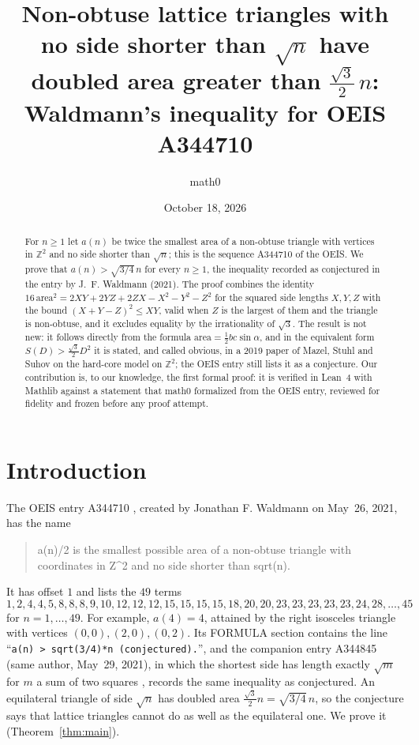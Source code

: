 \documentclass[11pt]{amsart}
\title[Non-obtuse lattice triangles (OEIS A344710)]{Non-obtuse lattice triangles with no side shorter than $\sqrt{n}$ have doubled area greater than $\frac{\sqrt3}{2}\,n$: Waldmann's inequality for OEIS A344710}
\author{math0}
\date{October 18, 2026}
\theoremstyle{plain}
\theoremstyle{definition}
\newcommand{\Z}{\mathbb{Z}}
\begin{document}
\begin{abstract}
For $n\ge1$ let $a(n)$ be twice the smallest area of a non-obtuse triangle with vertices in $\Z^2$ and no side shorter than $\sqrt n$; this is the sequence A344710 of the OEIS.
We prove that $a(n)>\sqrt{3/4}\,n$ for every $n\ge1$, the inequality recorded as conjectured in the entry by J.~F. Waldmann (2021).
The proof combines the identity $16\,\mathrm{area}^2=2XY+2YZ+2ZX-X^2-Y^2-Z^2$ for the squared side lengths $X,Y,Z$ with the bound $(X+Y-Z)^2\le XY$, valid when $Z$ is the largest of them and the triangle is non-obtuse, and it excludes equality by the irrationality of $\sqrt3$.
The result is not new: it follows directly from the formula $\mathrm{area}=\frac12 bc\sin\alpha$, and in the equivalent form $S(D)>\frac{\sqrt3}{2}D^2$ it is stated, and called obvious, in a 2019 paper of Mazel, Stuhl and Suhov on the hard-core model on $\Z^2$; the OEIS entry still lists it as a conjecture.
Our contribution is, to our knowledge, the first formal proof: it is verified in Lean~4 with Mathlib against a statement that math0 formalized from the OEIS entry, reviewed for fidelity and frozen before any proof attempt.
\end{abstract}
\maketitle

\section{Introduction}

The OEIS entry A344710 \cite{A344710}, created by Jonathan F. Waldmann on May~26, 2021, has the name
\begin{quote}
a(n)/2 is the smallest possible area of a non-obtuse triangle with coordinates in Z\^{}2 and no side shorter than sqrt(n).
\end{quote}
It has offset $1$ and lists the $49$ terms
\[
1,2,4,4,5,8,8,8,9,10,12,12,12,15,15,15,15,18,20,20,23,23,23,23,23,24,28,\dots,45
\]
for $n=1,\dots,49$. For example, $a(4)=4$, attained by the right isosceles triangle with vertices $(0,0),(2,0),(0,2)$.
Its FORMULA section contains the line ``\texttt{a(n) > sqrt(3/4)*n (conjectured).}'', and the companion entry A344845 \cite{A344845} (same author, May~29, 2021), in which the shortest side has length exactly $\sqrt m$ for $m$ a sum of two squares \cite{A001481}, records the same inequality as conjectured.
An equilateral triangle of side $\sqrt n$ has doubled area $\frac{\sqrt3}{2}n=\sqrt{3/4}\,n$, so the conjecture says that lattice triangles cannot do as well as the equilateral one.
We prove it (Theorem~\ref{thm:main}).
\end{document}
